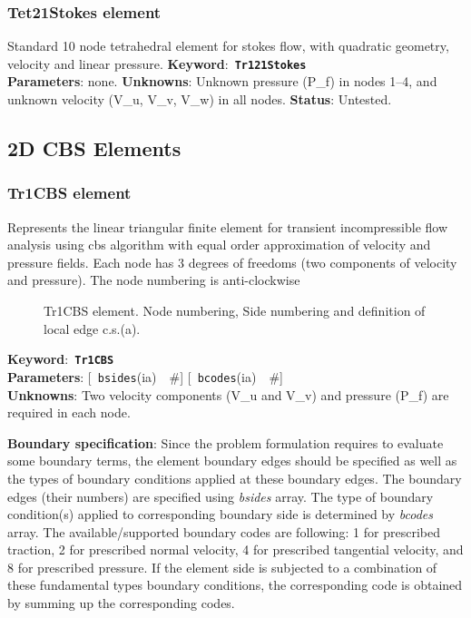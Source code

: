 \documentclass[a4paper]{article}
\newcommand{\descitem}[1]{{\noindent \bf #1}:}
\newcommand{\elemkeyword}[1]{\descitem{Keyword}~{\bf \texttt{#1}}}
\newcommand{\elemparam}[2]{{{\texttt{#1}\tiny (#2)}~~\#}}
\newcommand{\optelemparam}[2]{{[~\elemparam{#1}{#2}]}}
\newcommand{\param}[1]{{\em #1}}
\begin{document}
\subsubsection{Tet21Stokes element}
Standard 10 node tetrahedral element for stokes flow, with quadratic geometry, velocity and linear pressure.
\elemkeyword{Tr121Stokes}\\
\descitem{Parameters} none.
\descitem{Unknowns} Unknown pressure (P\_f) in nodes 1--4, and unknown velocity (V\_u, V\_v, V\_w) in all nodes.
\descitem{Status} Untested.

\subsection{2D CBS Elements}
\subsubsection{Tr1CBS element}
\label{Tr1CBS}
Represents the linear triangular finite element for transient
incompressible flow analysis using cbs algorithm with equal order
approximation of velocity and pressure fields. Each node has 3 degrees
of freedoms (two components of velocity and pressure).
The node numbering is anti-clockwise

\begin{figure}[tb]
 \centering
 \begin{makeimage}
  
 \end{makeimage}
 \caption{Tr1CBS element. Node numbering, Side numbering and
 definition of local edge c.s.(a).}
 \label{Tr1CBSfig}
\end{figure}

\elemkeyword{Tr1CBS}\\
\descitem{Parameters} \optelemparam{bsides}{ia} \optelemparam{bcodes}{ia}\\
\descitem{Unknowns}
Two velocity components (V\_u and V\_v) and pressure (P\_f) are required in each node.

\descitem{Boundary specification}
Since the problem formulation requires to evaluate some boundary terms,
the element boundary edges should be specified as well as the types of
boundary conditions applied at these boundary edges. The boundary
edges (their numbers) are specified using \param{bsides} array. The
type of boundary condition(s) applied to corresponding boundary side
is determined by \param{bcodes} array. The available/supported
boundary codes are following: 1 for prescribed traction, 2 for
prescribed normal velocity, 4 for prescribed tangential velocity, and
8 for prescribed pressure. If the element side is subjected to a
combination of these fundamental types boundary conditions, the
corresponding code is obtained by summing up the corresponding codes.
\end{document}
